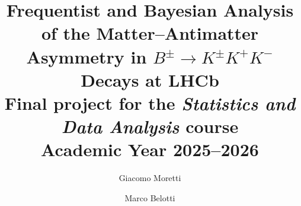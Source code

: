 \documentclass[%
 reprint,
 nofootinbib,
 amsmath,amssymb,
 aps,
 floatfix,
]{revtex4-2}
\begin{document}
\pagestyle{plain}

\title{Frequentist and Bayesian Analysis of the Matter--Antimatter Asymmetry in $B^{\pm} \to K^{\pm} K^{+} K^{-}$ Decays at LHCb\\[2.0ex]
\small Final project for the \textit{Statistics and Data Analysis} course\\
\small Academic Year 2025--2026}

\author{Giacomo Moretti}
\author{Marco Belotti}



\maketitle
















\end{document}
